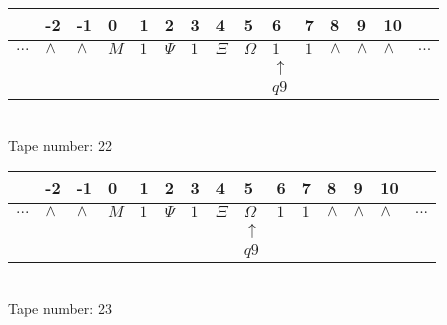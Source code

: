 \documentclass{article}
\begin{document}
\begin{table}[H]
\centering
\begin{tabular}{lllllllllllllll}
 & -2 & -1 & 0 & 1 & 2 & 3 & 4 & 5 & 6 & 7 & 8 & 9 & 10 & \\
\hline
$...$ & \multicolumn{1}{|l|}{$\wedge$} & \multicolumn{1}{|l|}{$\wedge$} & \multicolumn{1}{|l|}{$M$} & \multicolumn{1}{|l|}{$1$} & \multicolumn{1}{|l|}{$\Psi$} & \multicolumn{1}{|l|}{$1$} & \multicolumn{1}{|l|}{$\Xi$} & \multicolumn{1}{|l|}{$\Omega$} & \multicolumn{1}{|l|}{$1$} & \multicolumn{1}{|l|}{$1$} & \multicolumn{1}{|l|}{$\wedge$} & \multicolumn{1}{|l|}{$\wedge$} & \multicolumn{1}{|l|}{$\wedge$} & $...$\\
\hline
&  &  &  &  &  &  &  &  & $\uparrow$ &  &  &  &  &  \\
&  &  &  &  &  &  &  &  & $ q9 $ &  &  &  &  &  \\
\end{tabular}
\\
Tape number: 22
\noindent\makebox[\linewidth]{\hdashrule{\textwidth}{1pt}{1pt}}\end{table}

\begin{table}[H]
\centering
\begin{tabular}{lllllllllllllll}
 & -2 & -1 & 0 & 1 & 2 & 3 & 4 & 5 & 6 & 7 & 8 & 9 & 10 & \\
\hline
$...$ & \multicolumn{1}{|l|}{$\wedge$} & \multicolumn{1}{|l|}{$\wedge$} & \multicolumn{1}{|l|}{$M$} & \multicolumn{1}{|l|}{$1$} & \multicolumn{1}{|l|}{$\Psi$} & \multicolumn{1}{|l|}{$1$} & \multicolumn{1}{|l|}{$\Xi$} & \multicolumn{1}{|l|}{$\Omega$} & \multicolumn{1}{|l|}{$1$} & \multicolumn{1}{|l|}{$1$} & \multicolumn{1}{|l|}{$\wedge$} & \multicolumn{1}{|l|}{$\wedge$} & \multicolumn{1}{|l|}{$\wedge$} & $...$\\
\hline
&  &  &  &  &  &  &  & $\uparrow$ &  &  &  &  &  &  \\
&  &  &  &  &  &  &  & $ q9 $ &  &  &  &  &  &  \\
\end{tabular}
\\
Tape number: 23
\noindent\makebox[\linewidth]{\hdashrule{\textwidth}{1pt}{1pt}}\end{table}
\end{document}
